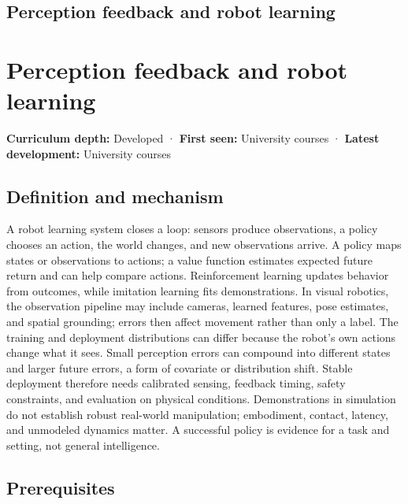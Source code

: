 \hypertarget{appendix-b0c42da325f1}{}
\section*{Perception feedback and robot learning}
\chapter{Perception feedback and robot learning}\label{appendix-b0c42da325f1-perception-feedback-and-robot-learning}

\textbf{Curriculum depth:} Developed · \textbf{First seen:} University courses · \textbf{Latest development:} University courses

\section{Definition and mechanism}\label{appendix-b0c42da325f1-definition-and-mechanism}

A robot learning system closes a loop: sensors produce observations, a policy chooses an action, the world changes, and new observations arrive. A policy maps states or observations to actions; a value function estimates expected future return and can help compare actions. Reinforcement learning updates behavior from outcomes, while imitation learning fits demonstrations. In visual robotics, the observation pipeline may include cameras, learned features, pose estimates, and spatial grounding; errors then affect movement rather than only a label. The training and deployment distributions can differ because the robot's own actions change what it sees. Small perception errors can compound into different states and larger future errors, a form of covariate or distribution shift. Stable deployment therefore needs calibrated sensing, feedback timing, safety constraints, and evaluation on physical conditions. Demonstrations in simulation do not establish robust real-world manipulation; embodiment, contact, latency, and unmodeled dynamics matter. A successful policy is evidence for a task and setting, not general intelligence.

\section{Prerequisites}\label{appendix-b0c42da325f1-prerequisites}


